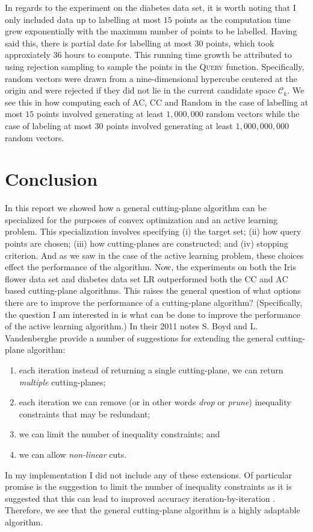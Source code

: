 \documentclass[11pt]{amsart}
\theoremstyle{definition}
\theoremstyle{remark}
\begin{document}
        In regards to the experiment on the diabetes data set, it is worth noting that I only included data up to labelling at most $15$ points as the computation time grew exponentially with the maximum number of points to be labelled. Having said this, there is partial date for labelling at most $30$ points, which took approxiately $36$ hours to compute. This running time growth be attributed to using rejection sampling to sample the points in the \textsc{Query} function. Specifically, random vectors were drawn from a nine-dimensional hypercube centered at the origin and were rejected if they did not lie in the current candidate space $\mathcal{C}_k$. We see this in how computing each of AC, CC and Random in the case of labelling at most $15$ points involved generating at least $1, 000, 000$ random vectors while the case of labeling at most $30$ points involved generating at least $1, 000, 000, 000$ random vectors.

\section{Conclusion}\label{s:conc}
    
    In this report we showed how a general cutting-plane algorithm can be specialized for the purposes of convex optimization and an active learning problem. This specialization involves specifying (i) the target set; (ii) how query points are chosen; (iii) how cutting-planes are constructed; and (iv) stopping criterion. And as we saw in the case of the active learning problem, these choices effect the performance of the algorithm. Now, the experiments on both the Iris flower data set and diabetes data set LR outperformed both the CC and AC based cutting-plane algorithms. This raises the general question of what options there are to improve the performance of a cutting-plane algorithm? (Specifically, the question I am interested in is what can be done to improve the performance of the active learning algorithm.) In their 2011 notes S. Boyd and L. Vandenberghe \cite[Section 5]{BV11} provide a number of suggestions for extending the general cutting-plane algorithm:
    \begin{enumerate}
        \item each iteration instead of returning a single cutting-plane, we can return \emph{ multiple} cutting-planes;
        \item each iteration we can remove (or in other words \emph{drop} or \emph{prune}) inequality constraints that may be redundant;
        \item we can limit the number of inequality constraints; and
        \item we can allow \emph{non-linear} cuts.
    \end{enumerate}
    In my implementation I did not include any of these extensions. Of particular promise is the suggestion to limit the number of inequality constraints as it is suggested that this can lead to improved accuracy iteration-by-iteration \cite[Section 5]{BV11}. Therefore, we see that the general cutting-plane algorithm is a highly adaptable algorithm.
\end{document}
